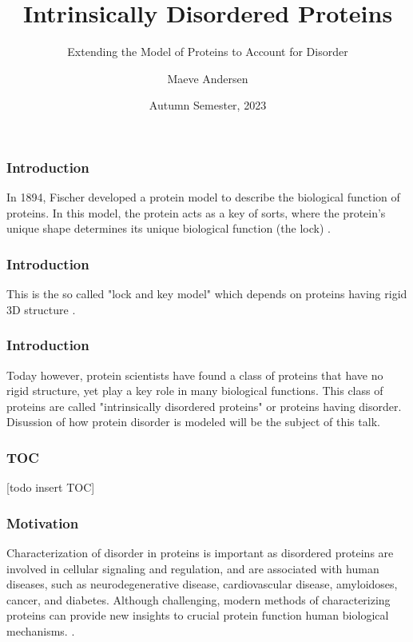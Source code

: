 \documentclass{beamer}
\title{Intrinsically Disordered Proteins}
\subtitle{Extending the Model of Proteins to Account for Disorder}
\author{Maeve Andersen}
\date{Autumn Semester, 2023}
\begin{document}
\frame{\titlepage}

\begin{frame}
\frametitle{Introduction}
In 1894, Fischer developed a protein model to describe the biological function of proteins. In this model, the protein acts as a key of sorts, where the protein's unique shape determines its unique biological function (the lock) \cite{fischerEinflussConfigurationAuf1894}.
\end{frame}
\begin{frame}
\frametitle{Introduction}
This is the so called "lock and key model" which depends on proteins having rigid 3D structure \cite{fischerEinflussConfigurationAuf1894}.
\end{frame}

\begin{frame}
\frametitle{Introduction}
Today however, protein scientists have found a class of proteins that have no rigid structure, yet play a key role in many biological functions. This class of proteins are called "intrinsically disordered proteins" or proteins having disorder. Disussion of how protein disorder is modeled will be the subject of this talk.
\end{frame}

\begin{frame}
\frametitle{TOC}
[todo insert TOC]
\end{frame}


\begin{frame}
\frametitle{Motivation}
Characterization of disorder in proteins is important as disordered proteins are involved in cellular signaling and regulation,\cite{wrightIntrinsicallyDisorderedProteins2015}
and are associated with human diseases, such as neurodegenerative disease, cardiovascular disease, amyloidoses, cancer, and diabetes.\cite{uverskyIntrinsicallyDisorderedProteins2008}
Although challenging, modern methods of characterizing proteins can provide new insights to crucial protein function human biological mechanisms. \cite{bonomiSimultaneousDeterminationProtein2018}.
\end{frame}
\end{document}
